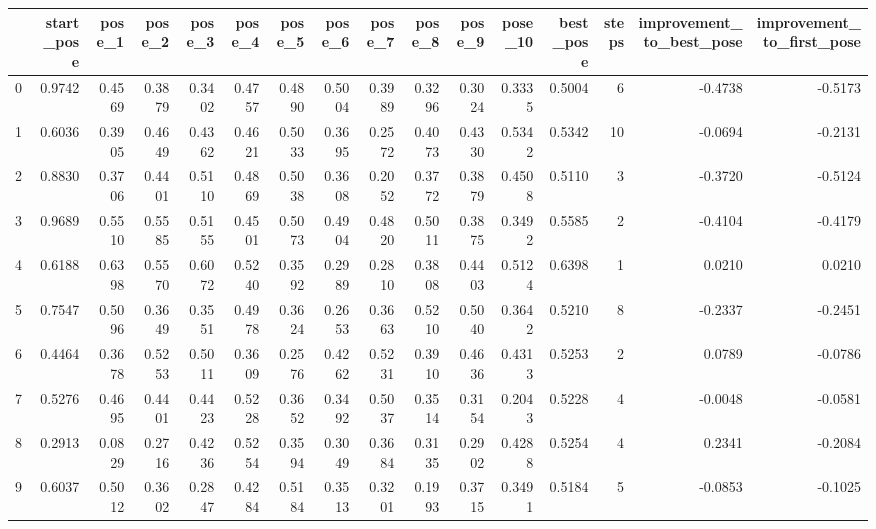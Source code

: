 \begin{tabular}{lrrrrrrrrrrrrrrr}
\toprule
{} &  start\_pose &  pose\_1 &  pose\_2 &  pose\_3 &  pose\_4 &  pose\_5 &  pose\_6 &  pose\_7 &  pose\_8 &  pose\_9 &  pose\_10 &  best\_pose &  steps &  improvement\_to\_best\_pose &  improvement\_to\_first\_pose \\
\midrule
0 &      0.9742 &  0.4569 &  0.3879 &  0.3402 &  0.4757 &  0.4890 &  0.5004 &  0.3989 &  0.3296 &  0.3024 &   0.3335 &     0.5004 &      6 &                   -0.4738 &                    -0.5173 \\
1 &      0.6036 &  0.3905 &  0.4649 &  0.4362 &  0.4621 &  0.5033 &  0.3695 &  0.2572 &  0.4073 &  0.4330 &   0.5342 &     0.5342 &     10 &                   -0.0694 &                    -0.2131 \\
2 &      0.8830 &  0.3706 &  0.4401 &  0.5110 &  0.4869 &  0.5038 &  0.3608 &  0.2052 &  0.3772 &  0.3879 &   0.4508 &     0.5110 &      3 &                   -0.3720 &                    -0.5124 \\
3 &      0.9689 &  0.5510 &  0.5585 &  0.5155 &  0.4501 &  0.5073 &  0.4904 &  0.4820 &  0.5011 &  0.3875 &   0.3492 &     0.5585 &      2 &                   -0.4104 &                    -0.4179 \\
4 &      0.6188 &  0.6398 &  0.5570 &  0.6072 &  0.5240 &  0.3592 &  0.2989 &  0.2810 &  0.3808 &  0.4403 &   0.5124 &     0.6398 &      1 &                    0.0210 &                     0.0210 \\
5 &      0.7547 &  0.5096 &  0.3649 &  0.3551 &  0.4978 &  0.3624 &  0.2653 &  0.3663 &  0.5210 &  0.5040 &   0.3642 &     0.5210 &      8 &                   -0.2337 &                    -0.2451 \\
6 &      0.4464 &  0.3678 &  0.5253 &  0.5011 &  0.3609 &  0.2576 &  0.4262 &  0.5231 &  0.3910 &  0.4636 &   0.4313 &     0.5253 &      2 &                    0.0789 &                    -0.0786 \\
7 &      0.5276 &  0.4695 &  0.4401 &  0.4423 &  0.5228 &  0.3652 &  0.3492 &  0.5037 &  0.3514 &  0.3154 &   0.2043 &     0.5228 &      4 &                   -0.0048 &                    -0.0581 \\
8 &      0.2913 &  0.0829 &  0.2716 &  0.4236 &  0.5254 &  0.3594 &  0.3049 &  0.3684 &  0.3135 &  0.2902 &   0.4288 &     0.5254 &      4 &                    0.2341 &                    -0.2084 \\
9 &      0.6037 &  0.5012 &  0.3602 &  0.2847 &  0.4284 &  0.5184 &  0.3513 &  0.3201 &  0.1993 &  0.3715 &   0.3491 &     0.5184 &      5 &                   -0.0853 &                    -0.1025 \\
\bottomrule
\end{tabular}
